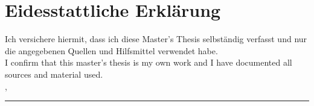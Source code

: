 \chapter{Eidesstattliche Erkl\"arung}
Ich versichere hiermit, dass ich diese Master's Thesis selbständig verfasst und nur die angegebenen Quellen und Hilfsmittel verwendet habe.
\\[1cm]
I confirm that this master's thesis is my own work and I have documented all sources and material used.
\\[6ex]

\city, \submissionDate

\vspace{1.5cm}
\rule[-0.2cm]{5cm}{0.5pt}

\textsc{\authorname} 
